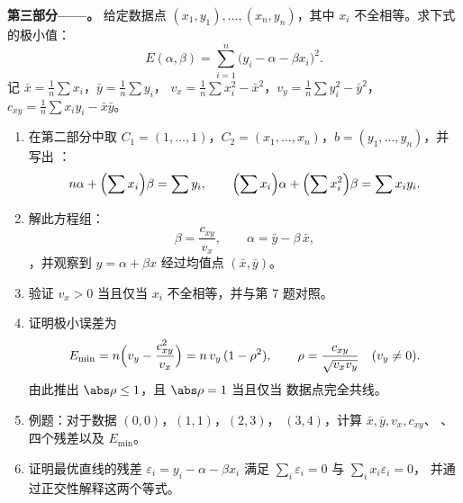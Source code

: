 \begin{problem}
\medskip
\noindent\textbf{第三部分——。} 给定数据点
$(x_1, y_1), \dots, (x_n, y_n)$，其中 $x_i$ 不全相等。求下式的极小值：
\[
E(\alpha, \beta) = \sum_{i=1}^{n}\bigl(y_i - \alpha - \beta
x_i\bigr)^2 .
\]
记 $\bar x = \frac1n\sum x_i$，$\bar y = \frac1n\sum y_i$，
$v_x = \frac1n\sum x_i^2 - \bar x^2$，$v_y = \frac1n\sum y_i^2 -
\bar y^2$，$c_{xy} = \frac1n\sum x_i y_i - \bar x\bar y$。
\begin{enumerate}[resume]
  \item 在第二部分中取 $C_1 = (1, \dots, 1)$，$C_2 =
        (x_1, \dots, x_n)$，$b = (y_1, \dots, y_n)$，并写出
        ：
        \[
        n\alpha + \Bigl(\sum x_i\Bigr)\beta = \sum y_i,
        \qquad
        \Bigl(\sum x_i\Bigr)\alpha + \Bigl(\sum
        x_i^2\Bigr)\beta = \sum x_i y_i .
        \]
  \item 解此方程组：
        \[
        \beta = \frac{c_{xy}}{v_x},
        \qquad
        \alpha = \bar y - \beta\,\bar x ,
        \]
        ，并观察到\emph{} $y = \alpha
        + \beta x$ 经过均值点 $(\bar x, \bar
        y)$。
  \item 验证 $v_x > 0$ 当且仅当 $x_i$
        不全相等，并与第 7 题对照。
  \item 证明极小误差为
        \[
        E_{\min} = n\Bigl(v_y - \frac{c_{xy}^2}{v_x}\Bigr)
        = n\,v_y\,(1 - \rho^2),
        \qquad
        \rho = \frac{c_{xy}}{\sqrt{v_x v_y}}
        \quad (v_y \neq 0).
        \]
        由此推出 $\abs\rho \leq 1$，且 $\abs\rho = 1$ 当且仅当
        数据点完全共线。
  \item 例题：对于数据 $(0,0)$，$(1,1)$，$(2,3)$，
        $(3,4)$，计算 $\bar x, \bar y, v_x, c_{xy}$、
        、四个残差以及 $E_{\min}$。
  \item 证明最优直线的残差 $\varepsilon_i = y_i - \alpha -
        \beta x_i$ 满足 $\sum_i
        \varepsilon_i = 0$ 与 $\sum_i x_i\varepsilon_i = 0$，
        并通过正交性解释这两个等式。
\end{enumerate}


\end{problem}
